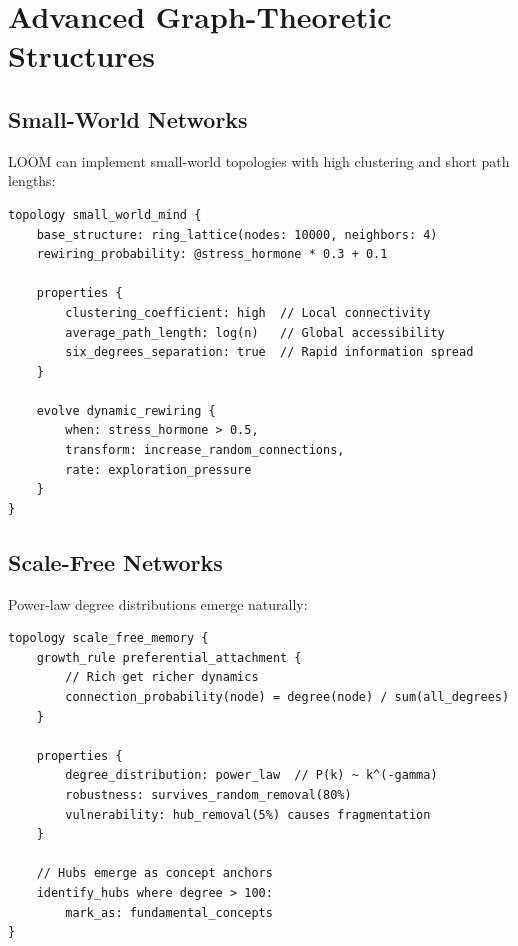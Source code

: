 \documentclass[12pt,a4paper,openany]{book} %
\begin{document}
\chapter{Advanced Graph-Theoretic Structures}

\section{Small-World Networks}

LOOM can implement small-world topologies with high clustering and short path lengths:

\vspace{0.5em}
\begin{lstlisting}[language=loom]
topology small_world_mind {
    base_structure: ring_lattice(nodes: 10000, neighbors: 4)
    rewiring_probability: @stress_hormone * 0.3 + 0.1

    properties {
        clustering_coefficient: high  // Local connectivity
        average_path_length: log(n)   // Global accessibility
        six_degrees_separation: true  // Rapid information spread
    }

    evolve dynamic_rewiring {
        when: stress_hormone > 0.5,
        transform: increase_random_connections,
        rate: exploration_pressure
    }
}
\end{lstlisting}
\vspace{0.5em}

\section{Scale-Free Networks}

Power-law degree distributions emerge naturally:

\vspace{0.5em}
\begin{lstlisting}[language=loom]
topology scale_free_memory {
    growth_rule preferential_attachment {
        // Rich get richer dynamics
        connection_probability(node) = degree(node) / sum(all_degrees)
    }

    properties {
        degree_distribution: power_law  // P(k) ~ k^(-gamma)
        robustness: survives_random_removal(80%)
        vulnerability: hub_removal(5%) causes fragmentation
    }

    // Hubs emerge as concept anchors
    identify_hubs where degree > 100:
        mark_as: fundamental_concepts
}
\end{lstlisting}
\vspace{0.5em}
\end{document}
